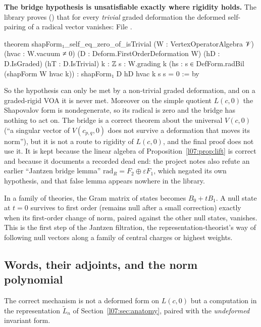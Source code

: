 \begin{warning}\label{l07:warn:bridge}
\textbf{The bridge hypothesis is unsatisfiable exactly where rigidity holds.} The library proves
() that for every \emph{trivial} graded deformation
the deformed self-pairing of a radical vector vanishes:
\noindent File .
\begin{leancode}
theorem shapForm₁_self_eq_zero_of_isTrivial (W : VertexOperatorAlgebra 𝒱)
    (hvac : W.vacuum ≠ 0) (D : Deform.FirstOrderDeformation W) (hD : D.IsGraded)
    (hT : D.IsTrivial) {k : ℤ} {s : W.grading k}
    (hs : s ∈ DefForm.radBil (shapForm W hvac k)) :
    shapForm₁ D hD hvac k s s = 0 := by
\end{leancode}
So the hypothesis  can only be met by a non-trivial graded deformation, and on a graded-rigid
VOA it is never met. Moreover on the simple quotient $L(c,0)$ the Shapovalov form is nondegenerate, so
its radical is zero and the bridge has nothing to act on. The bridge is a correct theorem about the
universal $V(c,0)$ (``a singular vector of $V(c_{p,q},0)$ does not survive a deformation that moves its
norm''), but it is not a route to rigidity of $L(c,0)$, and the final proof does not use it. It is kept
because the linear algebra of Proposition~\ref{l07:prop:lift} is correct and because it documents a
recorded dead end: the project notes also refute an earlier ``Jantzen bridge lemma''
$\mathrm{rad}_R = F_2\oplus\varepsilon F_1$, which negated its own hypothesis, and that false lemma appears
nowhere in the library.
\end{warning}

\begin{physics}
In a family of theories, the Gram matrix of states becomes $B_0+tB_1$. A null state at $t=0$ survives to first order
(remains null after a small correction) exactly when its first-order change of norm, paired against the other
null states, vanishes. This is the first step of the Jantzen filtration, the representation-theorist's way of
following null vectors along a family of central charges or highest weights.
\end{physics}

\subsection{Words, their adjoints, and the norm polynomial}

The correct mechanism is not a deformed form on $L(c,0)$ but a computation in the representation
$\widetilde L_n$ of Section~\ref{l07:sec:anatomy}, paired with the \emph{undeformed} invariant form.

